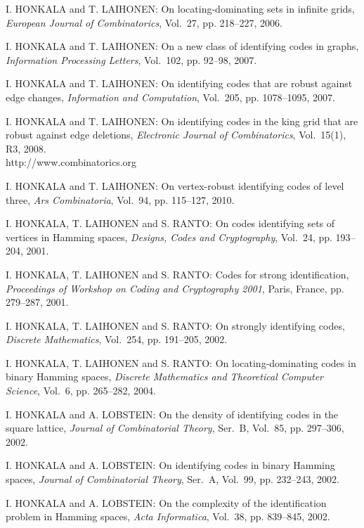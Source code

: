 \begin{thebibliography}{999}
I. HONKALA and T. LAIHONEN: On locating-dominating sets in infinite grids, {\it European Journal of Combinatorics}, Vol.~27, pp. 218--227, 2006.

I. HONKALA and T. LAIHONEN: On a new class of identifying codes in graphs, {\it Information Processing Letters}, Vol.~102, pp. 92--98, 2007.

I. HONKALA and T. LAIHONEN: On identifying codes that are robust against edge changes, {\it Information and Computation}, Vol.~205, pp. 1078--1095, 2007.

I. HONKALA and T. LAIHONEN: On identifying codes in the king grid that are robust against edge deletions, {\it Electronic Journal of Combinatorics}, Vol.~15(1), R3, 2008.\\
http://www.combinatorics.org

I. HONKALA and T. LAIHONEN: On vertex-robust identifying codes of level three, {\it Ars Combinatoria}, Vol.~94, pp. 115--127, 2010.

I. HONKALA, T. LAIHONEN and S. RANTO: On codes identifying sets of vertices in Hamming spaces, {\it Designs, Codes and Cryptography}, Vol.~24, pp. 193--204, 2001.

I. HONKALA, T. LAIHONEN and S. RANTO: Codes for strong identification, {\it Proceedings of Workshop on Coding and Cryptography 2001}, Paris, France, pp. 279--287, 2001.

I. HONKALA, T. LAIHONEN and S. RANTO: On strongly identifying codes, {\it Discrete Mathematics}, Vol.~254, pp. 191--205, 2002. 

I. HONKALA, T. LAIHONEN and S. RANTO: On locating-dominating codes in binary Hamming spaces, {\it Discrete Mathematics and Theoretical Computer Science}, Vol.~6, pp. 265--282, 2004.

I. HONKALA and A. LOBSTEIN: On the density of identifying codes in the square lattice, {\it Journal of Combinatorial Theory}, Ser.~B, Vol.~85, pp. 297--306, 2002.

I. HONKALA and A. LOBSTEIN: On identifying codes in binary Hamming spaces, {\it Journal of Combinatorial Theory}, Ser.~A, Vol.~99, pp. 232--243, 2002.

I. HONKALA and A. LOBSTEIN: On the complexity of the identification problem in Hamming spaces, {\it Acta Informatica}, Vol.~38, pp. 839--845, 2002.


\end{thebibliography}
